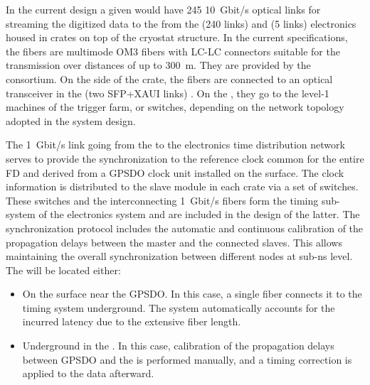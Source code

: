 In the current design 
a given  would have \num{245} \SI{10}{Gbit/s} optical links for streaming the digitized data to the  from the  (\num{240} links) and  (\num{5} links) electronics housed in  crates on top of the cryostat structure.  In the current specifications, the fibers are multimode OM3 fibers \cite{om3fibers} with LC-LC connectors suitable for the transmission over distances of up to \SI{300}{\metre}.  They are provided by the  consortium. On the side of the  crate, the fibers are connected to an optical transceiver in the  (two SFP+XAUI links) \cite{natmch}.  On the , they go to the level-1 machines of the trigger farm, or switches, depending on the network topology adopted in the  system design.

The \SI{1}{Gbit/s} link going from the  to the \dual electronics time distribution network serves to provide the synchronization to the reference clock common for the entire FD and derived from a GPSDO %
clock unit installed on the surface. The clock information is distributed to the  slave module in each  crate via a set of  switches. These switches and the interconnecting \SI{1}{Gbit/s} fibers form the timing sub-system of the \dual electronics system and are included in the design of the latter. The  synchronization protocol includes the automatic and continuous calibration of the propagation delays between the master and the connected slaves. This allows maintaining the overall synchronization between different nodes at sub-ns level. The  %
will be located either:
\begin{itemize}
\item{On the surface near the GPSDO. In this case, a single fiber connects it to the \dual timing system underground. %
The system automatically accounts for the incurred latency due to the extensive 
 fiber length.}
\item{Underground in the . In this case, calibration of the propagation delays between GPSDO and the  is performed manually, and a timing correction %
is applied to the data afterward.}
\end{itemize} 

